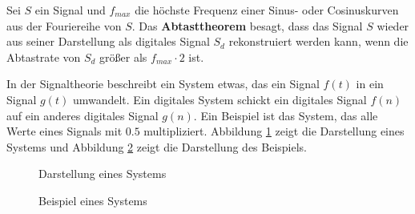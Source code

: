 Sei $S$ ein Signal und $f_{max}$ die höchste Frequenz einer 
Sinus- oder Cosinuskurven aus der Fouriereihe von $S$.
Das \textbf{Abtasttheorem} \cite[6.2]{grueningen2008dsv} besagt, dass das
Signal $S$ wieder aus seiner Darstellung als digitales Signal $S_d$
rekonstruiert werden kann, wenn die Abtastrate von $S_d$ größer als 
$f_{max} \cdot 2$ ist.

In der Signaltheorie beschreibt ein System etwas, das ein Signal $f(t)$ in ein
Signal $g(t)$ umwandelt. Ein digitales System schickt ein digitales Signal 
$f(n)$ auf ein anderes digitales Signal $g(n)$. Ein Beispiel ist das System,
das alle Werte eines Signals mit $0.5$ multipliziert. 
Abbildung \ref{fig:system_darstellung} zeigt die Darstellung eines Systems und
Abbildung \ref{fig:system_beispiel} zeigt die Darstellung des Beispiels.

\begin{figure}[ht]
    \centering
    \caption{Darstellung eines Systems}
    \label{fig:system_darstellung}
\end{figure}

\begin{figure}[ht]
    \centering
    \caption{Beispiel eines Systems}
    \label{fig:system_beispiel}
\end{figure}

